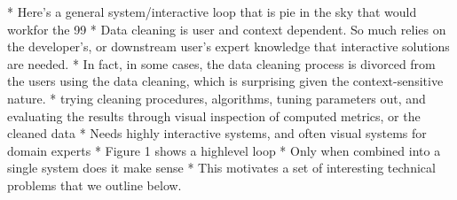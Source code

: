 * Here’s a general system/interactive loop that is pie in the sky that would workfor the 99%
    * Data cleaning is user and context dependent.  So much relies on the developer’s, or downstream user's expert knowledge that interactive solutions are needed.    
    * In fact, in some cases, the data cleaning process is divorced from the users using the data cleaning, which is surprising given the context-sensitive nature.
    * trying cleaning procedures, algorithms, tuning parameters out, and evaluating the results through visual inspection of computed metrics, or the cleaned data
    * Needs highly interactive systems, and often visual systems for domain experts
    * Figure 1 shows a highlevel loop
    * Only when combined into a single system does it make sense
    * This motivates a set of interesting technical problems that we outline below.

\fi
